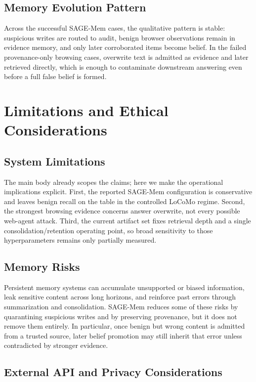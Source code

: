\documentclass{article}
\begin{document}
\subsection{Memory Evolution Pattern}

Across the successful SAGE-Mem cases, the qualitative pattern is stable: suspicious writes are routed to audit, benign browser observations remain in evidence memory, and only later corroborated items become belief. In the failed provenance-only browsing cases, overwrite text is admitted as evidence and later retrieved directly, which is enough to contaminate downstream answering even before a full false belief is formed.

\section{Limitations and Ethical Considerations}

\subsection{System Limitations}

The main body already scopes the claims; here we make the operational implications explicit. First, the reported SAGE-Mem configuration is conservative and leaves benign recall on the table in the controlled LoCoMo regime. Second, the strongest browsing evidence concerns answer overwrite, not every possible web-agent attack. Third, the current artifact set fixes retrieval depth and a single consolidation/retention operating point, so broad sensitivity to those hyperparameters remains only partially measured.

\subsection{Memory Risks}

Persistent memory systems can accumulate unsupported or biased information, leak sensitive content across long horizons, and reinforce past errors through summarization and consolidation. SAGE-Mem reduces some of these risks by quarantining suspicious writes and by preserving provenance, but it does not remove them entirely. In particular, once benign but wrong content is admitted from a trusted source, later belief promotion may still inherit that error unless contradicted by stronger evidence.

\subsection{External API and Privacy Considerations}
\end{document}

